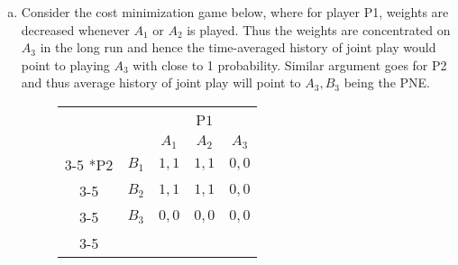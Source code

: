 \documentclass[a4paper,12pt]{article}
\theoremstyle{definition}
\begin{document}
\begin{enumerate}
\begin{enumerate}[(a)]
 \item Consider the cost minimization game below, where for player P1, weights are decreased whenever $A_1$ or $A_2$ is played. Thus the weights are concentrated on $A_3$ in the long run and hence the time-averaged history of joint play would point to playing $A_3$ with close to 1 probability. Similar argument goes for P2 and thus average history of joint play will point to $A_3,B_3$ being the PNE.
 
 \begin{figure}[h]
\renewcommand{\arraystretch}{1.5}
    \centering
    \begin{tabular}{cc|c|c|c|}
      & \multicolumn{1}{c}{} & \multicolumn{3}{c}{P$1$}\\
      & \multicolumn{1}{c}{} & \multicolumn{1}{c}{$A_1$}  & \multicolumn{1}{c}{$A_2$} &\multicolumn{1}{c}{$A_3$}\\\cline{3-5}
      \multirow{3}*{P$2$}  & $B_1$ & $1,1$ & $1,1$& $0,0$\\\cline{3-5}
      \cline{3-5}
& $B_2$ & $1,1$ & $1,1$& $0,0$\\\cline{3-5}
      & $B_3$ & $0,0$ & $0,0$ &$0,0$\\\cline{3-5}
    \end{tabular}
 \end{figure}   

 
\end{enumerate}


\end{enumerate}
\end{document}
